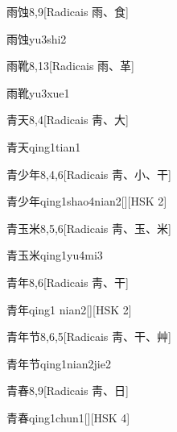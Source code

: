 \begin{entry}{雨蚀}{8,9}[Radicais ⾬、⾷]
  \begin{phonetics}{雨蚀}{yu3shi2}
  \end{phonetics}
\end{entry}

\begin{entry}{雨靴}{8,13}[Radicais ⾬、⾰]
  \begin{phonetics}{雨靴}{yu3xue1}
  \end{phonetics}
\end{entry}

\begin{entry}{青天}{8,4}[Radicais ⾭、⼤]
  \begin{phonetics}{青天}{qing1tian1}
  \end{phonetics}
\end{entry}

\begin{entry}{青少年}{8,4,6}[Radicais ⾭、⼩、⼲]
  \begin{phonetics}{青少年}{qing1shao4nian2}[][HSK 2]
  \end{phonetics}
\end{entry}

\begin{entry}{青玉米}{8,5,6}[Radicais ⾭、⽟、⽶]
  \begin{phonetics}{青玉米}{qing1yu4mi3}
  \end{phonetics}
\end{entry}

\begin{entry}{青年}{8,6}[Radicais ⾭、⼲]
  \begin{phonetics}{青年}{qing1 nian2}[][HSK 2]
  \end{phonetics}
\end{entry}

\begin{entry}{青年节}{8,6,5}[Radicais ⾭、⼲、⾋]
  \begin{phonetics}{青年节}{qing1nian2jie2}
  \end{phonetics}
\end{entry}

\begin{entry}{青春}{8,9}[Radicais ⾭、⽇]
  \begin{phonetics}{青春}{qing1chun1}[][HSK 4]
  \end{phonetics}
\end{entry}

